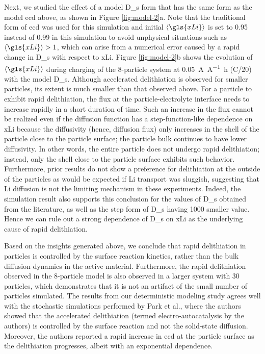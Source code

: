 \documentclass{article}
\begin{document}
Next, we studied the effect of a model \gls{D_s} form that has the
same form as the model \gls{ecd} above, as shown in Figure
\ref{fig:model-2}a. Note that the traditional form of \gls{ecd} was
used for this simulation and initial $\left\langle \gls{xLi}
\right\rangle$ is set to \num{0.95} instead of \num{0.99} in this
simulation to avoid unphysical situations such as $\left\langle
\gls{xLi} \right\rangle > 1$, which can arise from a numerical error
caused by a rapid change in \gls{D_s} with respect to
\gls{xLi}. Figure \ref{fig:model-2}b shows the evolution of
$\left\langle \gls{xLi} \right\rangle$ during charging of the
8-particle system at \SI{0.05}{\ampere\per\ampere\hour} (C/20) with
the model \gls{D_s}. Although accelerated delithiation is observed for
smaller particles, its extent is much smaller than that observed
above. For a particle to exhibit rapid delithiation, the flux at the
particle-electrolyte interface needs to increase rapidly in a short
duration of time. Such an increase in the flux cannot be realized even
if the diffusion function has a step-function-like dependence on
\gls{xLi} because the diffusivity (hence, diffusion flux) only
increases in the shell of the particle close to the particle surface;
the particle bulk continues to have lower diffusivity. In other words,
the entire particle does not undergo rapid delithiation; instead, only
the shell close to the particle surface exhibits such
behavior. Furthermore, prior results do not show a preference for delithiation at the outside of the particles\cite{lu2021} as would be expected if Li transport was sluggish, suggesting that Li diffusion is not the limiting mechanism in these experiments. Indeed, the simulation result also supports this
conclusion for the values of \gls{D_s} obtained from the literature,
as well as the step form of \gls{D_s} having 1000 smaller value. Hence we can rule out
a strong dependence of \gls{D_s} on \gls{xLi} as the underlying cause
of rapid delithiation.

Based on the insights generated above, we conclude that rapid
delithiation in \nca{} particles is controlled by the surface reaction
kinetics, rather than the bulk  diffusion dynamics in the
active material. Furthermore, the rapid delithiation
  observed in the 8-particle model is also observed in a larger
system with 30 particles, which demonstrates that it is not an
artifact of the small number of particles simulated. The results from
our deterministic modeling study agrees well with the stochastic
simulations performed by Park et al.\cite{chueh2021}, where the
authors showed that the accelerated delithiation (termed
electro-autocatalysis by the authors) is controlled by the surface
reaction and not the solid-state diffusion. Moreover, the authors
reported a rapid increase in \gls{ecd} at the \nca{} particle surface
as the delithiation progresses, albeit with an exponential dependence. 
\end{document}
